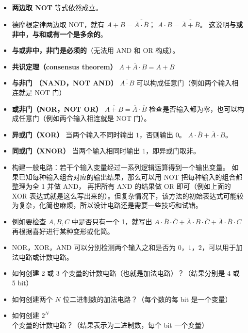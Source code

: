 \begin{itemize}
\item \textbf{两边取 NOT} 等式依然成立。
\item 德摩根定律两边取 NOT，就有 $A+B = \overline{\overline A \cdot \overline B}$； $A \cdot B = \overline{\overline A + \overline B}$。 这说明\textbf{与或非中，与和或有一个是多余的}。
\item \textbf{与或非中，非门是必须的}（无法用 AND 和 OR 构成）。
\item \textbf{共识定理（consensus theorem）} $A + \overline A \cdot B = A + B$
\item \textbf{与非门 （NAND，NOT AND）} $\overline{A\cdot B}$ 可以构成任意门（例如两个输入相连就是 NOT 门）
\item \textbf{或非门（NOR，NOT OR）} $\overline{A+B}=\overline A\cdot\overline B$ 检查是否输入都为零，也可以构成任意门（例如两个输入相连就是 NOT 门）。
\item \textbf{异或门（XOR）} 当两个输入不同时输出 $1$，否则输出 $0$。 $A\cdot\overline B+\overline A\cdot B$。
\item \textbf{同或门（XNOR）} 当两个输入相同时输出 $1$，即异或门取非。
\item 构建一般电路：若干个输入变量经过一系列逻辑运算得到一个输出变量。 如果已知每种输入组合对应的输出结果，那么可以用 NOT 把每种输入的组合都整理为全 1 并做 AND， 再把所有 AND 的结果做 OR 即可（例如上面的 XOR 表达式就是这么写出来的）。但复杂情况下，该方法的初始表达式可能较为复杂，化简也麻烦，所以设计电路还是需要一些技巧和试错。
\item 例如要检查 $A,B,C$ 中是否只有一个 1，就写出 $A\cdot\overline B\cdot\overline C + \overline A\cdot B\cdot\overline C + \overline A\cdot\overline B\cdot C$ 再根据喜好进行某种变形或化简。
\item NOR，XOR，AND 可以分别检测两个输入之和是否为 $0$，$1$，$2$，可以用于加法电路或计数电路。
\end{itemize}

\begin{exercise}{}
\begin{itemize}
\item 如何创建 2 或 3 个变量的计数电路（也就是加法电路）？（结果分别是 4 或 5 bit）
\item 如何创建两个 $N$ 位二进制数的加法电路？（每个数的每 bit 是一个变量）
\item 如何创建 $2^N$ 个变量的计数电路？（结果表示为二进制数，每个 bit 一个变量）
\end{itemize}
\end{exercise}
